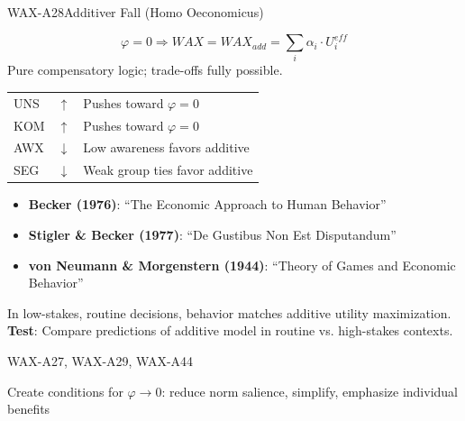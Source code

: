 
\begin{axiomspec}{WAX-A28}{Additiver Fall (Homo Oeconomicus)}

\begin{equation}
\varphi = 0 \Rightarrow WAX = WAX_{add} = \sum_i \alpha_i \cdot U_i^{eff}
\end{equation}
Pure compensatory logic; trade-offs fully possible.

\begin{tabular}{lll}
UNS & $\uparrow$ & Pushes toward $\varphi = 0$ \\
KOM & $\uparrow$ & Pushes toward $\varphi = 0$ \\
AWX & $\downarrow$ & Low awareness favors additive \\
SEG & $\downarrow$ & Weak group ties favor additive \\
\end{tabular}

\begin{itemize}
\item \textbf{Becker (1976)}: ``The Economic Approach to Human Behavior''
\item \textbf{Stigler \& Becker (1977)}: ``De Gustibus Non Est Disputandum''
\item \textbf{von Neumann \& Morgenstern (1944)}: ``Theory of Games and Economic Behavior''
\end{itemize}

In low-stakes, routine decisions, behavior matches additive utility maximization.
\textbf{Test}: Compare predictions of additive model in routine vs. high-stakes contexts.

WAX-A27, WAX-A29, WAX-A44

Create conditions for $\varphi \rightarrow 0$: reduce norm salience, simplify, emphasize individual benefits

\end{axiomspec}


